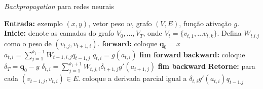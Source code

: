 \documentclass[
	12pt,				%
    oneside,			%
	a4paper,			%
	english,			%
	french,				%
	spanish,			%
	brazil,				%
	]{abntex2}
\begin{document}
        \begin{algorithm}[bht]
            \caption{\emph{Backpropagation} para redes neurais}
            \label{alg:backprop}
            \begin{algorithmic}[1]
                \State \textbf{Entrada:} exemplo $(x,y)$, vetor peso $w$, grafo $(V,E)$, função ativação $g$.
                \State \textbf{Inicie:} denote as camados do grafo $V_0,\dots,V_T$, onde $V_t = \{v_{t,1},\dots v_{t,k}\}$. Defina $W_{t.i.j}$ como o peso de $(v_{t,j}, v_{t+1,i})$.
                \State \textbf{forward:}
                    \State coloque $\textbf{q}_0 = x$
                            \State $a_{t,i} = \sum_{j=1}^{k_t - 1}W_{t-1,i,j}q_{t-1,j}$
                            \State $q_{t,i} = g(a_{t,i})$
                        \EndFor
                    \EndFor
                \State \textbf{fim forward}
                \State \textbf{backward:}
                    \State coloque $\delta_T = \textbf{q}_0 - y$
                            \State $\delta_{t,i} = \sum_{j=1}^{k_t + 1}W_{t,j,i}\delta_{t+1,j}g'(a_{t+1,j})$
                        \EndFor
                    \EndFor
                    \State \textbf{fim backward}
                \State \textbf{Retorne:} para cada $(v_{t-1,j},v_{t,i}) \in E$.
                    \State \hspace{\algorithmicindent} coloque a derivada parcial igual a $\delta_{t,i}g'(a_{t,i})q_{t-1.j}$
            \end{algorithmic}
        \end{algorithm}
\end{document}
